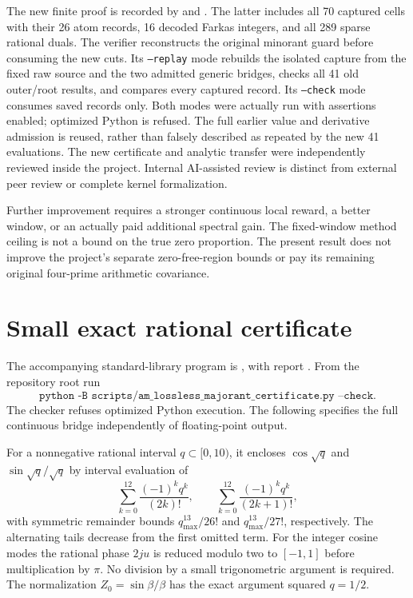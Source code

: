 \documentclass[11pt,a4paper]{article}
\theoremstyle{remark}
\begin{document}
The new finite proof is recorded by
{\small{}} and
{\small{}}.
The latter includes all 70 captured cells with their 26 atom records,
16 decoded Farkas integers, and all 289 sparse rational duals.
The verifier reconstructs the original minorant guard before consuming
the new cuts. Its \texttt{--replay} mode rebuilds the isolated capture
from the fixed raw source and the two admitted generic bridges,
checks all 41 old outer/root results, and compares every captured record.
Its \texttt{--check} mode consumes saved records only. Both modes were
actually run with assertions enabled; optimized Python is refused.
The full earlier value and derivative admission is reused, rather
than falsely described as repeated by the new 41 evaluations.
The new certificate and analytic transfer were independently reviewed
inside the project. Internal AI-assisted review is distinct from
external peer review or complete kernel formalization.

Further improvement requires a stronger continuous local reward,
a better window, or an actually paid additional spectral gain.
The fixed-window method ceiling is not a bound on the true zero
proportion. The present result does not improve the project's
separate zero-free-region bounds or pay its remaining original
four-prime arithmetic covariance.

\appendix
\section{Small exact rational certificate}\label{app:certificate}

The accompanying standard-library program is
{\small{}}, with report
{\small{}}.
From the repository root run
\[
 \texttt{python -B scripts/am\_lossless\_majorant\_certificate.py --check}.
\]
The checker refuses optimized Python execution.
The following specifies the full continuous bridge independently
of floating-point output.

For a nonnegative rational interval $q\subset[0,10)$, it encloses
$\cos\sqrt q$ and $\sin\sqrt q/\sqrt q$ by interval evaluation of
\[
 \sum_{k=0}^{12}\frac{(-1)^kq^k}{(2k)!},
 \qquad
 \sum_{k=0}^{12}\frac{(-1)^kq^k}{(2k+1)!},
\]
with symmetric remainder bounds
$q_{\max}^{13}/26!$ and $q_{\max}^{13}/27!$, respectively.
The alternating tails decrease from the first omitted term.
For the integer cosine modes the rational phase $2ju$ is
reduced modulo two to $[-1,1]$ before multiplication by $\pi$.
No division by a small trigonometric argument is required.
The normalization $Z_0=\sin\beta/\beta$ has the exact argument
squared $q=1/2$.
\end{document}
